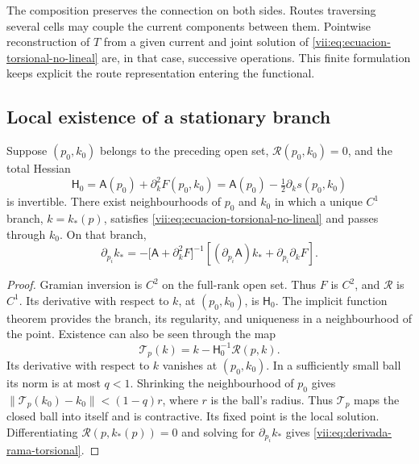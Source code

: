 The composition preserves the connection on both sides. Routes
traversing several cells may couple the current components
between them. Pointwise reconstruction of \(T\) from a given
current and joint solution of
\eqref{vii:eq:ecuacion-torsional-no-lineal} are, in that case,
successive operations. This finite formulation keeps explicit
the route representation entering the functional.

\subsection{Local existence of a stationary branch}
\label{vii:subsec:rama-torsional-local}

\begin{theorem}
\label{vii:thm:rama-torsional-local}
Suppose \((p_0,k_0)\) belongs to the preceding open set,
\(\mathcal R(p_0,k_0)=0\), and the total Hessian
\begin{equation}
 \mathsf H_0
 =\mathsf A(p_0)+\partial_k^2F(p_0,k_0)
 =\mathsf A(p_0)-\tfrac12\partial_ks(p_0,k_0)
 \label{vii:eq:hessiano-total-torsional}
\end{equation}
is invertible. There exist neighbourhoods of \(p_0\) and \(k_0\) in which
a unique \(C^1\) branch, \(k=k_*(p)\), satisfies
\eqref{vii:eq:ecuacion-torsional-no-lineal} and passes through \(k_0\).
On that branch,
\begin{equation}
 \partial_{p_i}k_*
 =-\bigl[\mathsf A+\partial_k^2F\bigr]^{-1}
     \left[(\partial_{p_i}\mathsf A)k_*
                      +\partial_{p_i}\partial_kF\right].
 \label{vii:eq:derivada-rama-torsional}
\end{equation}
\end{theorem}

\begin{proof}
Gramian inversion is \(C^2\) on the full-rank open set.
Thus \(F\) is \(C^2\), and \(\mathcal R\) is
\(C^1\). Its derivative with respect to \(k\), at \((p_0,k_0)\), is
\(\mathsf H_0\). The implicit function theorem provides
the branch, its regularity, and uniqueness in a neighbourhood of the point.
Existence can also be seen through the map
\[
 \mathcal T_p(k)=k-\mathsf H_0^{-1}\mathcal R(p,k).
\]
Its derivative with respect to \(k\) vanishes at \((p_0,k_0)\).
In a sufficiently small ball its norm is at most
\(q<1\). Shrinking the neighbourhood of \(p_0\) gives
\(\|\mathcal T_p(k_0)-k_0\|<(1-q)r\), where \(r\) is the
ball's radius. Thus \(\mathcal T_p\) maps the closed ball
into itself and is contractive. Its fixed point is the local solution.
Differentiating \(\mathcal R(p,k_*(p))=0\) and solving for
\(\partial_{p_i}k_*\) gives
\eqref{vii:eq:derivada-rama-torsional}.
\end{proof}

